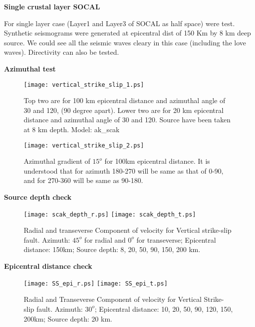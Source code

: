 \documentclass[11pt,titlepage,fleqn]{article}
\begin{document}
{\bf Single crustal layer SOCAL}

For single layer case (Layer1 and Layer3 of SOCAL as half space) were test. Synthetic seismograms were generated at epicentral dist of 150 Km by 8 km deep source. We could see all the seismic waves cleary in this case (including the love waves). Directivity can also be tested.


\pagebreak
{\bf Azimuthal test}
\begin{figure}[H]
\begin{center}
\texttt{[image: vertical\_strike\_slip\_1.ps]}
\caption[]
{{
Top two are for 100 km epicentral distance and azimuthal angle of 30 and 120, (90 degree apart). Lower two are for 20 km epicentral distance and azimuthal angle of 30 and 120. Source have been taken at 8 km depth. Model: ak\_scak
}}
\end{center}
\end{figure}

\begin{figure}[H]
\begin{center}
\texttt{[image: vertical\_strike\_slip\_2.ps]}
\caption[]
{{
Azimuthal gradient of $15^o$ for 100km epicentral distance. It is understood that for azimuth 180-270 will be same as that of 0-90, and for 270-360 will be same as 90-180.
}}
\end{center}
\end{figure}
\pagebreak
{\bf Source depth check}
\begin{figure}[H]
\begin{center}
\texttt{[image: scak\_depth\_r.ps]}
\texttt{[image: scak\_depth\_t.ps]}
\caption[]
{{
Radial and transeverse Component of velocity for Vertical strike-slip fault. Azimuth: $45^o$ for radial and $0^o$ for transeverse; Epicentral distance: 150km; Source depth: 8, 20, 50, 90, 150, 200 km.
}}
\end{center}
\end{figure}


\pagebreak
{\bf Epicentral distance check}
\begin{figure}[H]
\begin{center}
\texttt{[image: SS\_epi\_r.ps]}
\texttt{[image: SS\_epi\_t.ps]}
\caption[]
{{
Radial and Transeverse Component of velocity for Vertical Strike-slip fault. Azimuth: $30^o$; Epicentral distance: 10, 20, 50, 90, 120, 150, 200km; Source depth: 20 km.
}}
\end{center}
\end{figure}
\end{document}
